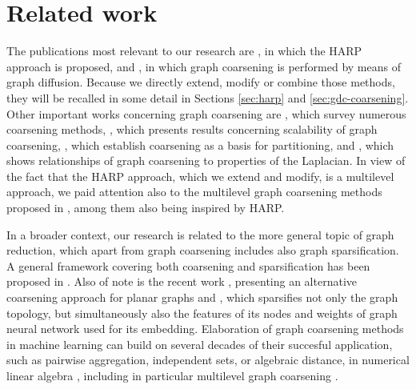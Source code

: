 \section{Related work}

The publications most relevant to our research are \cite{chen_harp_2018}, in which the HARP approach is proposed, and \cite{gasteiger_diffusion_2019}, in which graph coarsening is performed by means of graph diffusion. Because we directly extend, modify or combine those methods, they will be recalled in some detail in Sections \ref{sec:harp} and \ref{sec:gdc-coarsening}. Other important works concerning graph coarsening are \cite{akyildiz_understanding_2020,chen_graph_2022,cai_graph_2022}, which survey numerous coarsening methods, \cite{huang_scaling_2021}, which presents results concerning scalability of graph coarsening, \cite{catalyurek_multithreaded_2012,herrmann_multilevel_2019}, which establish coarsening as a basis for partitioning, and \cite{loukas_graph_2019}, which shows relationships of graph coarsening to properties of the Laplacian. In view of the fact that the HARP approach, which we extend and modify, is a multilevel approach, we paid attention also to the multilevel graph coarsening methods proposed in \cite{bethune_hierarchical_2020,xie_graph_2020,zhang_harp_2021,liu_hierarchical_2021}, among them \cite{zhang_harp_2021} also being inspired by HARP.

In a broader context, our research is related to the more general topic of graph reduction, which apart from graph coarsening includes also graph sparsification. A general framework covering both coarsening and sparsification has been proposed in \cite{bravo_hermsdorff_unifying_2019}. Also of note is the recent work \cite{kammer_space-efficient_2022}, presenting an alternative coarsening approach for planar graphs and \cite{liu_comprehensive_2022}, which sparsifies not only the graph topology, but simultaneously also the features of its nodes and weights of graph neural network used for its embedding. Elaboration of graph coarsening methods in machine learning can build on several decades of their succesful application, such as pairwise aggregation, independent sets, or algebraic distance, in numerical linear algebra \cite{chen_graph_2022}, including in particular multilevel graph coarsening \cite{osei-kuffuor_matrix_2015,ubaru_sampling_2019}.
